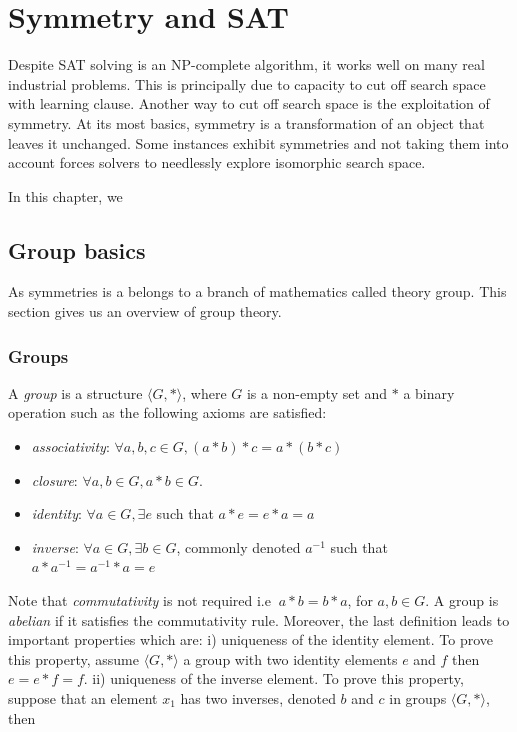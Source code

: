 \chapter{Symmetry and SAT}\label{chap:symmetryinsat}

Despite SAT solving is an NP-complete algorithm, it works well on many real industrial problems. This is 
principally due to capacity to cut off search space with learning clause. Another way to cut off search space is the exploitation of symmetry.
At its most basics, symmetry is a transformation of an object that leaves it unchanged. Some instances exhibit symmetries and not taking them into account 
forces solvers to needlessly explore isomorphic search space.  


In this chapter, we 


\section{Group basics}
As symmetries is a belongs to a branch of mathematics called theory group.
This section gives us an overview of group theory.

\subsection{Groups}
A \emph{group} is a structure $\langle G, * \rangle$, where $G$ is a non-empty set and $*$ a binary
operation such as the following axioms are satisfied:
\begin{itemize}[noitemsep,nolistsep]
 \item \emph{associativity}: $\forall a, b, c \in G, (a * b) * c = a * (b * c)$
 \item \emph{closure}: $\forall a, b \in G, a * b \in G$.
 \item \emph{identity}: $\forall a \in G, \exists e$ such that $ a * e = e * a = a$
 \item \emph{inverse}:  $\forall a \in G, \exists b \in G$, commonly denoted $a^{-1}$ such that
 $a * a^{-1} = a^{-1} * a = e$
\end{itemize}
Note that \emph{commutativity} is not required i.e $\ a * b = b * a$, for $a, b \in G$.
A group is \emph{abelian} if it satisfies the commutativity rule.
Moreover, the last definition leads to important properties which are: i) uniqueness of the identity element. 
To prove this property, assume $\langle G, * \rangle$ a group with two identity elements $e$ and $f$ 
then $ e = e * f = f$.
ii) uniqueness of the inverse element. To prove this property, suppose that an element $x_1$ has two inverses,
denoted $b$ and $c$ in groups $\langle G, * \rangle$, then\\

